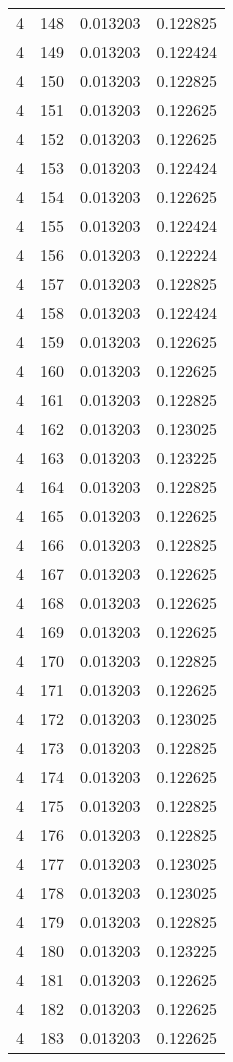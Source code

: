 \begin{longtable}{rrrr}
4 & 148 & 0.013203 & 0.122825 \\
4 & 149 & 0.013203 & 0.122424 \\
4 & 150 & 0.013203 & 0.122825 \\
4 & 151 & 0.013203 & 0.122625 \\
4 & 152 & 0.013203 & 0.122625 \\
4 & 153 & 0.013203 & 0.122424 \\
4 & 154 & 0.013203 & 0.122625 \\
4 & 155 & 0.013203 & 0.122424 \\
4 & 156 & 0.013203 & 0.122224 \\
4 & 157 & 0.013203 & 0.122825 \\
4 & 158 & 0.013203 & 0.122424 \\
4 & 159 & 0.013203 & 0.122625 \\
4 & 160 & 0.013203 & 0.122625 \\
4 & 161 & 0.013203 & 0.122825 \\
4 & 162 & 0.013203 & 0.123025 \\
4 & 163 & 0.013203 & 0.123225 \\
4 & 164 & 0.013203 & 0.122825 \\
4 & 165 & 0.013203 & 0.122625 \\
4 & 166 & 0.013203 & 0.122825 \\
4 & 167 & 0.013203 & 0.122625 \\
4 & 168 & 0.013203 & 0.122625 \\
4 & 169 & 0.013203 & 0.122625 \\
4 & 170 & 0.013203 & 0.122825 \\
4 & 171 & 0.013203 & 0.122625 \\
4 & 172 & 0.013203 & 0.123025 \\
4 & 173 & 0.013203 & 0.122825 \\
4 & 174 & 0.013203 & 0.122625 \\
4 & 175 & 0.013203 & 0.122825 \\
4 & 176 & 0.013203 & 0.122825 \\
4 & 177 & 0.013203 & 0.123025 \\
4 & 178 & 0.013203 & 0.123025 \\
4 & 179 & 0.013203 & 0.122825 \\
4 & 180 & 0.013203 & 0.123225 \\
4 & 181 & 0.013203 & 0.122625 \\
4 & 182 & 0.013203 & 0.122625 \\
4 & 183 & 0.013203 & 0.122625 \\

\end{longtable}

